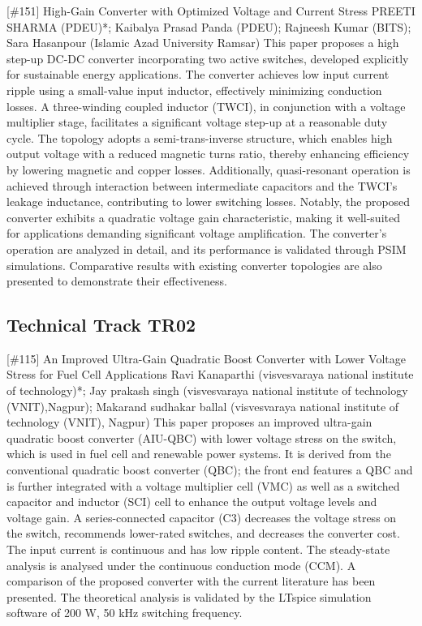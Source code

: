 {} \begin{abstract_online} {[\#151] High-Gain Converter with Optimized Voltage and Current Stress  } {} {PREETI SHARMA (PDEU)*; Kaibalya Prasad Panda (PDEU); Rajneesh  Kumar (BITS); Sara Hasanpour (Islamic Azad University Ramsar)} {} This paper proposes a high step-up DC-DC converter incorporating two active switches, developed explicitly for sustainable energy applications. The converter achieves low input current ripple using a small-value input inductor, effectively minimizing conduction losses. A three-winding coupled inductor (TWCI), in conjunction with a voltage multiplier stage, facilitates a significant voltage step-up at a reasonable duty cycle. The topology adopts a semi-trans-inverse structure, which enables high output voltage with a reduced magnetic turns ratio, thereby enhancing efficiency by lowering magnetic and copper losses. Additionally, quasi-resonant operation is achieved through interaction between intermediate capacitors and the TWCI's leakage inductance, contributing to lower switching losses. Notably, the proposed converter exhibits a quadratic voltage gain characteristic, making it well-suited for applications demanding significant voltage amplification. The converter's operation are analyzed in detail, and its performance is validated through PSIM simulations. Comparative results with existing converter topologies are also presented to demonstrate their effectiveness. \end{abstract_online} 
\clearpage \subsection{Technical Track TR02}\nopagebreak {} \begin{abstract_online} {[\#115] An Improved Ultra-Gain Quadratic Boost Converter  with Lower Voltage Stress for Fuel Cell  Applications} {} {Ravi Kanaparthi (visvesvaraya national institute of technology)*; Jay prakash singh (visvesvaraya national institute of technology (VNIT),Nagpur); Makarand sudhakar ballal (visvesvaraya national institute of technology (VNIT), Nagpur)} {} This paper proposes an improved ultra-gain quadratic boost converter (AIU-QBC) with lower voltage stress on the switch, which is used in fuel cell and renewable power systems. It is derived from the conventional quadratic boost converter (QBC); the front end features a QBC and is further integrated with a voltage multiplier cell (VMC) as well as a switched capacitor and inductor (SCI) cell to enhance the output voltage levels and voltage gain. A series-connected capacitor (C3) decreases the voltage stress on the switch, recommends lower-rated switches, and decreases the converter cost. The input current is continuous and has low ripple content. The steady-state analysis is analysed under the continuous conduction mode (CCM). A comparison of the proposed converter with the current literature has been presented. The theoretical analysis is validated by the LTspice simulation software of 200 W, 50 kHz switching frequency. \end{abstract_online} 
